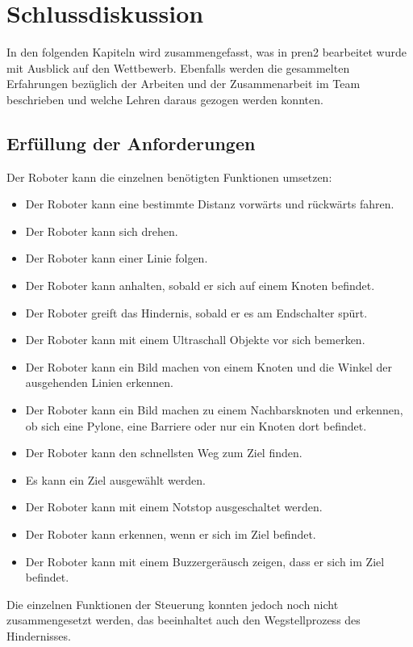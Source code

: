 \section{Schlussdiskussion}

In den folgenden Kapiteln wird zusammengefasst, was in \acrshort{pren2} bearbeitet wurde mit Ausblick auf den Wettbewerb.
Ebenfalls werden die gesammelten Erfahrungen bezüglich der Arbeiten und der Zusammenarbeit im Team beschrieben und welche Lehren daraus gezogen werden konnten.

\subsection{Erfüllung der Anforderungen}

Der Roboter kann die einzelnen benötigten Funktionen umsetzen:

\begin{itemize}
    \item Der Roboter kann eine bestimmte Distanz vorwärts und rückwärts fahren.
    \item Der Roboter kann sich drehen.
    \item Der Roboter kann einer Linie folgen.
    \item Der Roboter kann anhalten, sobald er sich auf einem Knoten befindet.
    \item Der Roboter greift das Hindernis, sobald er es am Endschalter spürt.
    \item Der Roboter kann mit einem Ultraschall Objekte vor sich bemerken.
    \item Der Roboter kann ein Bild machen von einem Knoten und die Winkel der ausgehenden Linien erkennen.
    \item Der Roboter kann ein Bild machen zu einem Nachbarsknoten und erkennen, ob sich eine Pylone, eine Barriere oder nur ein Knoten dort befindet.
    \item Der Roboter kann den schnellsten Weg zum Ziel finden.
    \item Es kann ein Ziel ausgewählt werden.
    \item Der Roboter kann mit einem Notstop ausgeschaltet werden.
    \item Der Roboter kann erkennen, wenn er sich im Ziel befindet.
    \item Der Roboter kann mit einem Buzzergeräusch zeigen, dass er sich im Ziel befindet.
\end{itemize}

Die einzelnen Funktionen der Steuerung konnten jedoch noch nicht zusammengesetzt werden, das beeinhaltet auch den Wegstellprozess des Hindernisses.

